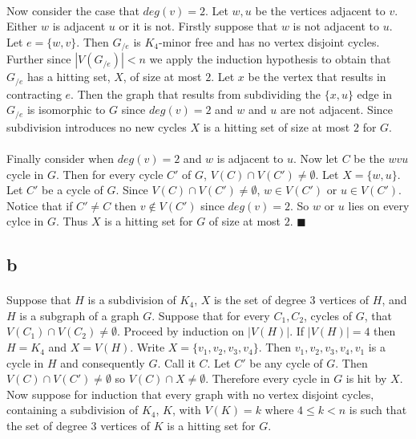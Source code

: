 \documentclass[letterpaper,12pt,oneside,onecolumn]{report}
\begin{document}
\paragraph{}
Now consider the case that $deg(v) = 2$. Let $w, u$ be the vertices adjacent to $v$. Either $w$ is adjacent $u$ or it is not. Firstly suppose that $w$ is not adjacent to $u$. Let $e = \{w,v\}$. Then $G_{/e}$ is $K_4$-minor free and has no vertex disjoint cycles. Further since $|V(G_{/e})| < n$ we apply the induction hypothesis to obtain that $G_{/e}$ has a hitting set, $X$, of size at most $2$. Let $x$ be the vertex that results in contracting $e$. Then the graph that results from subdividing the $\{x, u\}$ edge in $G_{/e}$ is isomorphic to $G$ since $deg(v)=2$ and $w$ and $u$ are not adjacent. Since subdivision introduces no new cycles $X$ is a hitting set of size at most $2$ for $G$.
\paragraph{}
Finally consider when $deg(v) = 2$ and $w$ is adjacent to $u$. Now let $C$ be the $wvu$ cycle in $G$. Then for every cycle $C'$ of $G$, $V(C) \cap V(C') \neq \emptyset$. Let $X = \{w,u\}$. Let $C'$ be a cycle of $G$. Since $V(C) \cap V(C') \neq \emptyset$, $w \in V(C')$ or $u \in V(C')$. Notice that if $C' \neq C$ then $v \not \in V(C')$ since $deg(v) = 2$. So $w$ or $u$ lies on every cylce in $G$. Thus $X$ is a hitting set for $G$ of size at most $2$. $\blacksquare$
\subsection*{b}
\paragraph{}
Suppose that $H$ is a subdivision of $K_4$, $X$ is the set of degree $3$ vertices of $H$, and $H$ is a subgraph of a graph $G$. Suppose that for every $C_1, C_2$, cycles of $G$, that $V(C_1) \cap V(C_2) \neq \emptyset$. Proceed by induction on $|V(H)|$. If $|V(H)|=4$ then $H = K_4$ and $X = V(H)$. Write $X = \{v_1,v_2,v_3,v_4\}$. Then $v_1,v_2,v_3,v_4,v_1$ is a cycle in $H$ and consequently $G$. Call it $C$. Let $C'$ be any cycle of $G$. Then $V(C) \cap V(C') \neq \emptyset$ so $V(C) \cap X \neq \emptyset$. Therefore every cycle in $G$ is hit by $X$. Now suppose for induction that every graph with no vertex disjoint cycles, containing a subdivision of $K_4$, $K$, with $V(K) = k$ where $4 \leq k < n$ is such that the set of degree $3$ vertices of $K$ is a hitting set for $G$.
\end{document}

